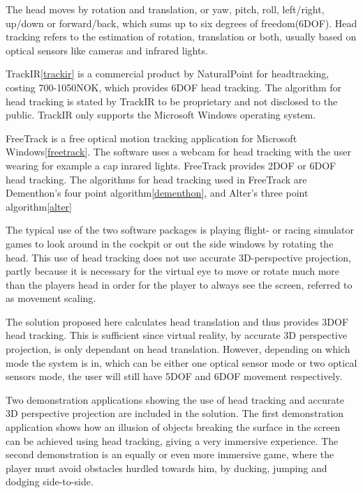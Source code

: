 The head moves by rotation and translation, or
yaw, pitch, roll, left/right, up/down or forward/back, which sums up to six degrees of freedom(6DOF).
Head tracking refers to the estimation of rotation, translation or both, usually based on 
optical sensors like cameras and infrared lights.

TrackIR\ref{trackir} is a commercial product by NaturalPoint for headtracking, costing 700-1050NOK, which provides 6DOF head tracking.
The algorithm for head tracking is stated by TrackIR to be proprietary and not disclosed to the public. TrackIR only supports the Microsoft Windows operating system.

FreeTrack is a free optical motion tracking application for Microsoft Windows\ref{freetrack}. The software uses
a webcam for head tracking with the user wearing for example a cap inrared lights. FreeTrack provides 2DOF or 6DOF head tracking.
The algorithms for head tracking used in FreeTrack are Dementhon's four point algorithm\ref{dementhon}, and Alter's three point algorithm\ref{alter}

The typical use of the two software packages is playing flight- or racing simulator games
to look around in the cockpit or out the side windows by rotating the head. 
This use of head tracking does not use accurate 3D-perspective projection, partly because it is
necessary for the virtual eye to move or rotate much more than the players head in order for the player to always see the screen, referred to as movement scaling.

The solution proposed here calculates head translation and thus provides 3DOF head tracking. 
This is sufficient since virtual reality, by accurate 3D perspective projection, is only dependant on head translation.
However, depending on which mode the system is in, which can be either one optical sensor mode or two optical sensors mode,
the user will still have 5DOF and 6DOF movement respectively. 

Two demonstration applications showing the use of head tracking and accurate 3D perspective projection are included in the solution.
The first demonstration application shows how an illusion of objects breaking the surface in the screen can be achieved using head tracking,
giving a very immersive experience. The second demonstration is an equally or even more immersive game, where the player must avoid
obstacles hurdled towards him, by ducking, jumping and dodging side-to-side.
